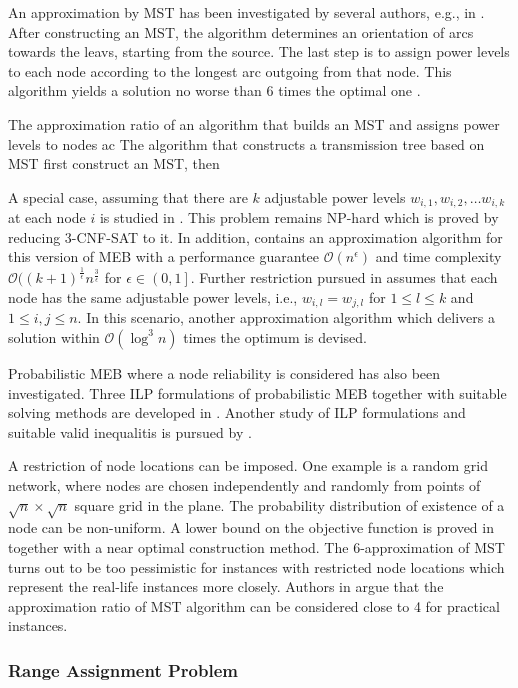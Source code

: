 An approximation by MST has been investigated by several authors, e.g., in \cite{clementi01}.
After constructing an MST, the algorithm determines an orientation of arcs towards the leavs, starting from the source.
The last step is to assign power levels to each node according to the longest arc outgoing from that node.
This algorithm yields a solution no worse than 6 times the optimal one \cite{ambuhl05}.

The approximation ratio of an algorithm that builds an MST and assigns power levels to nodes ac
The algorithm that constructs a transmission tree based on MST first construct an MST, then 

A special case, assuming that there are $k$ adjustable power levels $w_{i,1},w_{i,2},\dots w_{i,k}$ at each node $i$ is studied in \cite{liang02}.
This problem remains NP-hard which is proved by reducing \textsc{3-CNF-SAT} to it.
In addition, \cite{liang02} contains an approximation algorithm for this version of MEB with a performance guarantee $\mathcal{O}(n^\epsilon)$ and 
time complexity $\mathcal{O}((k+1)^{\frac{1}{\epsilon}} n^{\frac{3}{\epsilon}}$ for $\epsilon\in \left(0,1\right]$.
Further restriction pursued in \cite{liang02} assumes that each node has the same adjustable power levels, i.e., $w_{i,l}=w_{j,l}$ for $1\leq l\leq k$ and $1\leq i,j\leq n$.
In this scenario, another approximation algorithm which delivers a solution within $\mathcal{O}(\log^3 n)$ times the optimum is devised.

Probabilistic MEB where a node reliability is considered has also been investigated.
Three ILP formulations of probabilistic MEB together with suitable solving methods are developed in \cite{montemanni08}.
Another study of ILP formulations and suitable valid inequalitis is pursued by \cite{barta10}.

A restriction of node locations can be imposed.
One example is a random grid network, where nodes are chosen independently and randomly from points of $\sqrt{n}\times\sqrt{n}$ square grid in the plane.
The probability distribution of existence of a node can be non-uniform.
A lower bound on the objective function is proved in \cite{calamoneri08} together with a near optimal construction method.
The 6-approximation of MST turns out to be too pessimistic for instances with restricted node locations which represent the real-life instances more closely.
Authors in \cite{flammini07} argue that the approximation ratio of MST algorithm can be considered close to 4 for practical instances.

\subsubsection{Range Assignment Problem}

